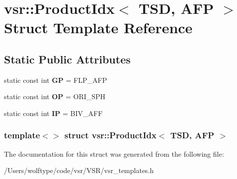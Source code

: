 \hypertarget{structvsr_1_1_product_idx_3_01_t_s_d_00_01_a_f_p_01_4}{\section{vsr\-:\-:Product\-Idx$<$ T\-S\-D, A\-F\-P $>$ Struct Template Reference}
\label{structvsr_1_1_product_idx_3_01_t_s_d_00_01_a_f_p_01_4}
}
\subsection*{Static Public Attributes}
\begin{DoxyCompactItemize}
\item 
\hypertarget{structvsr_1_1_product_idx_3_01_t_s_d_00_01_a_f_p_01_4_ae126bd0dd5e0e99fe508ea942a5fa9fd}{static const int {\bfseries G\-P} = F\-L\-P\-\_\-\-A\-F\-P}\label{structvsr_1_1_product_idx_3_01_t_s_d_00_01_a_f_p_01_4_ae126bd0dd5e0e99fe508ea942a5fa9fd}

\item 
\hypertarget{structvsr_1_1_product_idx_3_01_t_s_d_00_01_a_f_p_01_4_a4273099f4c008ba6b3bb524d855b6335}{static const int {\bfseries O\-P} = O\-R\-I\-\_\-\-S\-P\-H}\label{structvsr_1_1_product_idx_3_01_t_s_d_00_01_a_f_p_01_4_a4273099f4c008ba6b3bb524d855b6335}

\item 
\hypertarget{structvsr_1_1_product_idx_3_01_t_s_d_00_01_a_f_p_01_4_ac3002dc8384abcb8c33928582be04faa}{static const int {\bfseries I\-P} = B\-I\-V\-\_\-\-A\-F\-F}\label{structvsr_1_1_product_idx_3_01_t_s_d_00_01_a_f_p_01_4_ac3002dc8384abcb8c33928582be04faa}

\end{DoxyCompactItemize}
\subsubsection*{template$<$$>$ struct vsr\-::\-Product\-Idx$<$ T\-S\-D, A\-F\-P $>$}



The documentation for this struct was generated from the following file\-:\begin{DoxyCompactItemize}
\item 
/\-Users/wolftype/code/vsr/\-V\-S\-R/vsr\-\_\-templates.\-h\end{DoxyCompactItemize}
